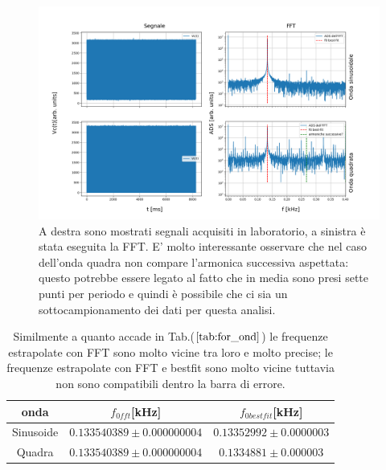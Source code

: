 \documentclass{article}
\begin{document}
         \begin{figure}[H]
            \centering
            \includegraphics[width=\textwidth]{FFT5/FFTwaveforms3.png}
            \caption{A destra sono mostrati segnali acquisiti in laboratorio, a sinistra 
                    è stata eseguita la FFT.
                    E' molto interessante osservare che nel caso dell'onda quadra 
                    non compare l'armonica successiva aspettata: questo potrebbe essere 
                    legato al fatto che in media sono presi sette punti per periodo e quindi 
                    è possibile che ci sia un sottocampionamento dei dati per questa analisi.}
            \label{fig:for_lun}
        \end{figure}    


         \begin{table}[H]
            \centering
            \caption{}
                \begin{tabular}{ccc}
                    onda            &   $f_{0fft}$[kHz]                     & $f_{0bestfit}$[kHz] \\
                    \hline
                    Sinusoide       &   $0.133540389 \pm 0.000000004$           & $0.13352992 \pm 0.0000003$ \\
                    Quadra          &   $0.133540389 \pm 0.000000004$           & $0.1334881 \pm  0.000003$ \\
                \end{tabular}
                \caption{Similmente a quanto accade in Tab.($\ref{tab:for_ond}$) le 
                frequenze estrapolate con FFT sono molto vicine tra loro e molto precise;
                le frequenze estrapolate con FFT e bestfit sono molto vicine tuttavia non 
                sono compatibili dentro la barra di errore.}
                \label{tab:for_lun}
        \end{table}
        
\end{document}
